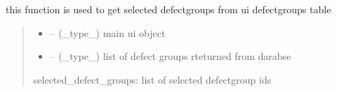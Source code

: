 \documentclass[letterpaper,10pt,english]{sphinxmanual}
\begin{document}
\begin{savenotes}\begin{fulllineitems}
\label{\detokenize{setting/backend/defect_management_funcs:oxin.backend.defect_management_funcs.get_selected_defect_groups}}
\pysigstartsignatures
{}
\pysigstopsignatures
\sphinxAtStartPar
this function is used to get selected defect\sphinxhyphen{}groups from ui defect\sphinxhyphen{}groups table
\begin{quote}\begin{description}
\begin{itemize}
\item {} 
\sphinxAtStartPar
{} – (\_type\_) main ui object

\item {} 
\sphinxAtStartPar
{} – (\_type\_) list of defect groups rteturned from darabse

\end{itemize}

\sphinxAtStartPar
selected\_defect\_groups: list of selected defect\sphinxhyphen{}group ids

\end{description}\end{quote}

\end{fulllineitems}\end{savenotes}

\end{document}
